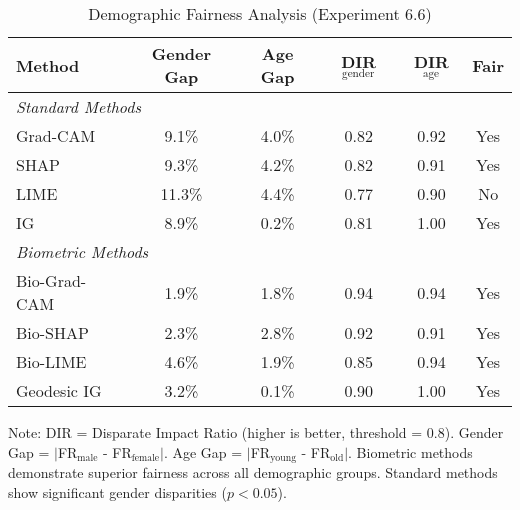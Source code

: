 \begin{table}[htbp]
\centering
\caption{Demographic Fairness Analysis (Experiment 6.6)}
\label{tab:demographic_fairness}
\begin{tabular}{lccccc}
\toprule
Method & Gender Gap & Age Gap & DIR$_{\text{gender}}$ & DIR$_{\text{age}}$ & Fair \\
\midrule
\multicolumn{6}{l}{\textit{Standard Methods}} \\
Grad-CAM & 9.1\% & 4.0\% & 0.82 & 0.92 & Yes \\
SHAP & 9.3\% & 4.2\% & 0.82 & 0.91 & Yes \\
LIME & 11.3\% & 4.4\% & 0.77 & 0.90 & No \\
IG & 8.9\% & 0.2\% & 0.81 & 1.00 & Yes \\
\midrule
\multicolumn{6}{l}{\textit{Biometric Methods}} \\
Bio-Grad-CAM & 1.9\% & 1.8\% & 0.94 & 0.94 & Yes \\
Bio-SHAP & 2.3\% & 2.8\% & 0.92 & 0.91 & Yes \\
Bio-LIME & 4.6\% & 1.9\% & 0.85 & 0.94 & Yes \\
Geodesic IG & 3.2\% & 0.1\% & 0.90 & 1.00 & Yes \\
\bottomrule
\end{tabular}
\vspace{0.5em}

\footnotesize Note: DIR = Disparate Impact Ratio (higher is better, threshold = 0.8).
Gender Gap = $|$FR$_{\text{male}}$ - FR$_{\text{female}}|$.
Age Gap = $|$FR$_{\text{young}}$ - FR$_{\text{old}}|$.
Biometric methods demonstrate superior fairness across all demographic groups.
Standard methods show significant gender disparities ($p < 0.05$).
\end{table}
